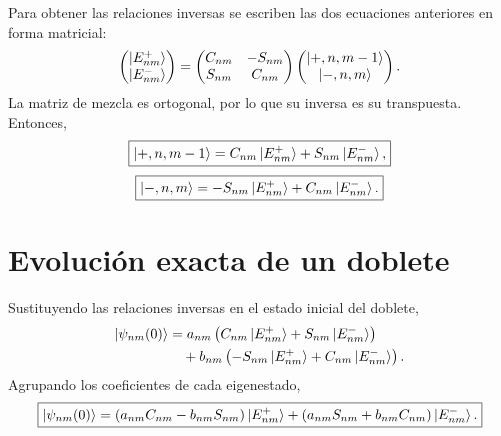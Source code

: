 \documentclass[11pt]{article}
\begin{document}
Para obtener las relaciones inversas se escriben las dos ecuaciones anteriores
en forma matricial:
\begin{equation}
  \begin{pmatrix}
  \ket{E_{nm}^{+}}\\
  \ket{E_{nm}^{-}}
  \end{pmatrix}
  =
  \begin{pmatrix}
  C_{nm} & -S_{nm}\\
  S_{nm} & C_{nm}
  \end{pmatrix}
  \begin{pmatrix}
  \ket{+,n,m-1}\\
  \ket{-,n,m}
  \end{pmatrix}.
\end{equation}
La matriz de mezcla es ortogonal, por lo que su inversa es su transpuesta.
Entonces,
\begin{equation}
  \boxed{
  \ket{+,n,m-1}
  =
  C_{nm}\ket{E_{nm}^{+}}
  +
  S_{nm}\ket{E_{nm}^{-}},
  }
\end{equation}
\begin{equation}
  \boxed{
  \ket{-,n,m}
  =
  -S_{nm}\ket{E_{nm}^{+}}
  +
  C_{nm}\ket{E_{nm}^{-}}.
  }
\end{equation}

\section{Evoluci\'on exacta de un doblete}

Sustituyendo las relaciones inversas en el estado inicial del doblete,
\begin{align}
  \ket{\psi_{nm}(0)}
  &=
  a_{nm}
  \left(
  C_{nm}\ket{E_{nm}^{+}}
  +
  S_{nm}\ket{E_{nm}^{-}}
  \right)
  \notag\\
  &\quad+
  b_{nm}
  \left(
  -S_{nm}\ket{E_{nm}^{+}}
  +
  C_{nm}\ket{E_{nm}^{-}}
  \right).
\end{align}
Agrupando los coeficientes de cada eigenestado,
\begin{equation}
  \boxed{
  \ket{\psi_{nm}(0)}
  =
  \left(a_{nm}C_{nm}-b_{nm}S_{nm}\right)\ket{E_{nm}^{+}}
  +
  \left(a_{nm}S_{nm}+b_{nm}C_{nm}\right)\ket{E_{nm}^{-}}.
  }
\end{equation}
\end{document}
